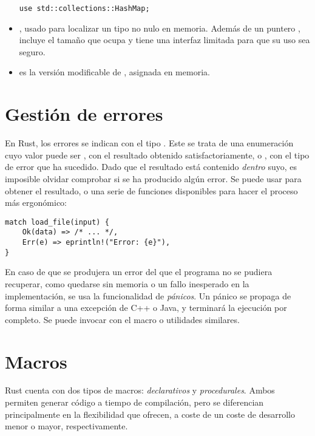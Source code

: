 \begin{itemize}
\begin{verbatim}
use std::collections::HashMap;
\end{verbatim}

    \item {}, usado para localizar un tipo  no nulo en
        memoria. Además de un puntero , incluye el tamaño que
        ocupa  y tiene una interfaz limitada para que su uso sea seguro.

    \item {} es la versión modificable de , asignada en
        memoria.

\end{itemize}

\section{Gestión de errores}

En Rust, los errores se indican con el tipo . Este se trata
de una enumeración cuyo valor puede ser , con el resultado obtenido
satisfactoriamente, o , con el tipo de error que ha sucedido. Dado
que el resultado está contenido \emph{dentro} suyo, es imposible olvidar
comprobar si se ha producido algún error. Se puede usar  para
obtener el resultado, o una serie de funciones disponibles para hacer el proceso
más ergonómico:

\begin{verbatim}
match load_file(input) {
    Ok(data) => /* ... */,
    Err(e) => eprintln!("Error: {e}"),
}
\end{verbatim}

En caso de que se produjera un error del que el programa no se pudiera
recuperar, como quedarse sin memoria o un fallo inesperado en la implementación,
se usa la funcionalidad de \emph{pánicos}. Un pánico se propaga de forma similar
a una excepción de C++ o Java, y terminará la ejecución por completo. Se puede
invocar con el macro  o utilidades similares.

\section{Macros}

Rust cuenta con dos tipos de macros: \emph{declarativos} y \emph{procedurales}.
Ambos permiten generar código a tiempo de compilación, pero se diferencian
principalmente en la flexibilidad que ofrecen, a coste de un coste de desarrollo
menor o mayor, respectivamente.

